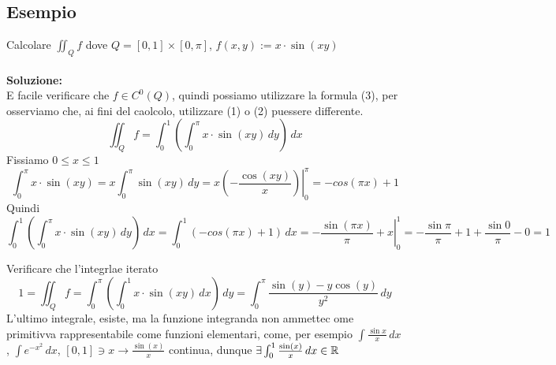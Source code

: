 \subsection{Esempio}
\begin{example}
  Calcolare $\iint_{Q} f$ dove $Q = [0,1]\times[0,\pi]$, $f(x,y):=x\cdot \sin(xy)$ \\\\
  \textbf{Soluzione:} \\
  \ac{E} facile verificare che $f \in C^0(Q)$, quindi possiamo utilizzare la formula (3), per\aco
  osserviamo che, ai fini del caolcolo, utilizzare (1) o (2) pu\aco essere differente.
  $$\iint_{Q}f = \int_{0}^{1}\left(\int_{0}^{\pi} x\cdot \sin(xy) \, dy\right) \, dx$$
  Fissiamo $0 \leq x \leq 1$
  $$\int_{0}^{\pi} x\cdot \sin(xy) = x \int_{0}^{\pi} \sin(xy) \, dy = x \left. \left(-\frac{\cos(xy)}{x}\right) \right|_{0}^{\pi}
  = -cos(\pi x)+1$$
  Quindi 
  $$\int_{0}^{1}\left(\int_{0}^{\pi}  x\cdot \sin(xy) \, dy\right)\, dx = 
  \int_{0}^{1} \left(-cos(\pi x)+1\right) \, dx = \left. - \frac{\sin(\pi x)}{\pi} + x \right|_{0}^{1} = 
  -\frac{\sin\pi}{\pi} + 1 + \frac{\sin0}{\pi} - 0 = 1$$
  \begin{exercise}
    Verificare che l'integrlae iterato 
    $$1 = \iint_{Q} f = \int_{0}^{\pi} \left(\int_{0}^{1} x\cdot \sin(xy) \, dx\right) \, dy = 
    \int_{0}^{\pi} \frac{\sin(y) - y\cos(y)}{y^2} \, dy$$
    L'ultimo integrale, esiste, ma la funzione integranda non ammettec ome primitivva rappresentabile come funzioni 
    elementari, come, per esempio $\int \frac{\sin{x}}{x}\,dx$, $\int e^{-x^2} \,dx$, 
    $[0,1]\ni x \to \frac{\sin(x)}{x}$ \ace continua, dunque $\exists \int_{0}^{1} \frac{\sin(x)}{x} \, dx \in \mathbb{R}$
  \end{exercise}
\end{example}